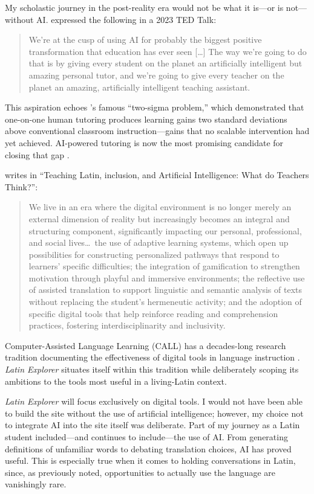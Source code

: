 \documentclass[11pt, a4paper]{article}
\begin{document}
My scholastic journey in the post-reality era would not be what it is---or
is not---without AI. \textcite{Khan2023} expressed the following in a 2023
TED Talk:
\begin{quote}
We're at the cusp of using AI for probably the biggest positive
transformation that education has ever seen [\ldots] The way we're going to
do that is by giving every student on the planet an artificially intelligent
but amazing personal tutor, and we're going to give every teacher on the
planet an amazing, artificially intelligent teaching assistant.
\end{quote}
This aspiration echoes \textcite{Bloom1984}'s famous ``two-sigma problem,''
which demonstrated that one-on-one human tutoring produces learning gains
two standard deviations above conventional classroom instruction---gains
that no scalable intervention had yet achieved. AI-powered tutoring is now
the most promising candidate for closing that gap \autocite{Mollick2023}.

\textcite{Colace2025} writes in ``Teaching Latin, inclusion, and Artificial
Intelligence: What do Teachers Think?'':
\begin{quote}
We live in an era where the digital environment is no longer merely an
external dimension of reality but increasingly becomes an integral and
structuring component, significantly impacting our personal, professional,
and social lives\ldots\ the use of adaptive learning systems, which open up
possibilities for constructing personalized pathways that respond to
learners' specific difficulties; the integration of gamification to
strengthen motivation through playful and immersive environments; the
reflective use of assisted translation to support linguistic and semantic
analysis of texts without replacing the student's hermeneutic activity; and
the adoption of specific digital tools that help reinforce reading and
comprehension practices, fostering interdisciplinarity and inclusivity.
\end{quote}

Computer-Assisted Language Learning (CALL) has a decades-long research
tradition documenting the effectiveness of digital tools in language
instruction \autocite{Warschauer1998, Chapelle2001}. \textit{Latin Explorer}
situates itself within this tradition while deliberately scoping its
ambitions to the tools most useful in a living-Latin context.

\textit{Latin Explorer} will focus exclusively on digital tools. I would
not have been able to build the site without the use of artificial
intelligence; however, my choice not to integrate AI into the site itself
was deliberate. Part of my journey as a Latin student included---and
continues to include---the use of AI. From generating definitions of
unfamiliar words to debating translation choices, AI has proved useful.
This is especially true when it comes to holding conversations in Latin,
since, as previously noted, opportunities to actually use the language are
vanishingly rare.
\end{document}
